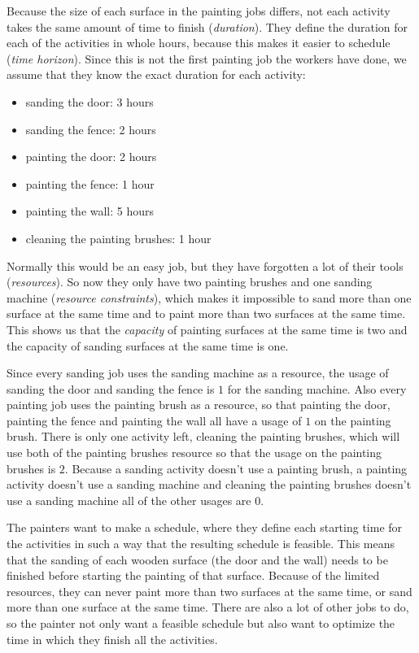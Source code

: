 \documentclass{article}
\theoremstyle{definition}
\begin{document}
Because the size of each surface in the painting jobs differs, not each activity takes the same amount of time to finish (\emph{duration}).
They define the duration for each of the activities in whole hours, because this makes it easier to schedule (\emph{time horizon}).
Since this is not the first painting job the workers have done, we assume that they know the exact duration for each activity:
\begin{itemize}
\item sanding the door: 3 hours
\item sanding the fence: 2 hours
\item painting the door: 2 hours
\item painting the fence: 1 hour
\item painting the wall: 5 hours
\item cleaning the painting brushes: 1 hour
\end{itemize}
Normally this would be an easy job, but they have forgotten a lot of their tools (\emph{resources}).
So now they only have two painting brushes and one sanding machine (\emph{resource constraints}), which makes it impossible to sand more than one surface at the same time and to paint more than two surfaces at the same time.
This shows us that the \emph{capacity} of painting surfaces at the same time is two and the capacity of sanding surfaces at the same time is one.

Since every sanding job uses the sanding machine as a resource, the usage of sanding the door and sanding the fence is $1$ for the sanding machine.
Also every painting job uses the painting brush as a resource, so that painting the door, painting the fence and painting the wall all have a usage of $1$ on the painting brush.
There is only one activity left, cleaning the painting brushes, which will use both of the painting brushes resource so that the usage on the painting brushes is $2$.
Because a sanding activity doesn't use a painting brush, a painting activity doesn't use a sanding machine and cleaning the painting brushes doesn't use a sanding machine all of the other usages are $0$.

The painters want to make a schedule, where they define each starting time for the activities in such a way that the resulting schedule is feasible.
This means that the sanding of each wooden surface (the door and the wall) needs to be finished before starting the painting of that surface.
Because of the limited resources, they can never paint more than two surfaces at the same time, or sand more than one surface at the same time.
There are also a lot of other jobs to do, so the painter not only want a feasible schedule but also want to optimize the time in which they finish all the activities.
\end{document}
